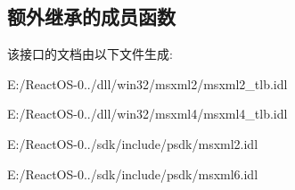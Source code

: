 \subsection*{额外继承的成员函数}


该接口的文档由以下文件生成\+:\begin{DoxyCompactItemize}
\item 
E\+:/\+React\+O\+S-\/0../dll/win32/msxml2/msxml2\+\_\+tlb.\+idl\item 
E\+:/\+React\+O\+S-\/0../dll/win32/msxml4/msxml4\+\_\+tlb.\+idl\item 
E\+:/\+React\+O\+S-\/0../sdk/include/psdk/msxml2.\+idl\item 
E\+:/\+React\+O\+S-\/0../sdk/include/psdk/msxml6.\+idl\end{DoxyCompactItemize}
